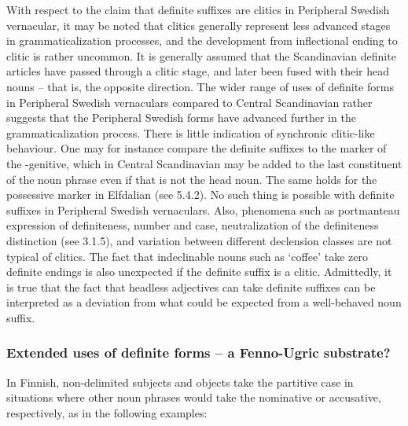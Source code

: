 With respect to the claim that definite suffixes are clitics in Peripheral Swedish vernacular, it may be noted that clitics generally represent less advanced stages in grammaticalization processes, and the development from inflectional ending to clitic is rather uncommon. It is generally assumed that the Scandinavian definite articles have passed through a clitic stage, and later been fused with their head nouns – that is, the opposite direction. The wider range of uses of definite forms in Peripheral Swedish vernaculars compared to Central Scandinavian rather suggests that the Peripheral Swedish forms have advanced further in the grammaticalization process. There is little indication of synchronic clitic-like behaviour. One may for instance compare the definite suffixes to the marker of the -genitive, which in Central Scandinavian may be added to the last constituent of the noun phrase even if that is not the head noun. The same holds for the possessive marker  in Elfdalian (see 5.4.2). No such thing is possible with definite suffixes in Peripheral Swedish vernaculars. Also, phenomena such as portmanteau expression of definiteness, number and case, neutralization of the definiteness distinction (see 3.1.5), and variation between different declension classes are not typical of clitics. The fact that indeclinable nouns such as  ‘coffee’ take zero definite endings is also unexpected if the definite suffix is a clitic. Admittedly, it is true that the fact that headless adjectives can take definite suffixes can be interpreted as a deviation from what could be expected from a well-behaved noun suffix.

\subsubsection[Extended uses of definite forms – a Fenno{}-Ugric substrate?]{\rmfamily Extended uses of definite forms – a Fenno-Ugric substrate?}
In Finnish, non-delimited subjects and objects take the partitive case in situations where other noun phrases would take the nominative or accusative, respectively, as in the following examples:

